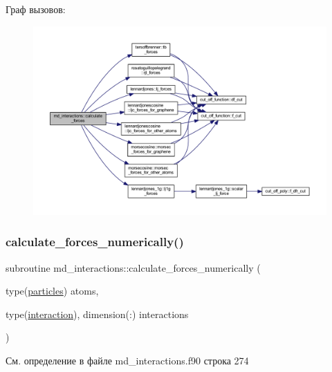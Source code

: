 Граф вызовов\+:\nopagebreak
\begin{figure}[H]
\begin{center}
\leavevmode
\includegraphics[width=350pt]{namespacemd__interactions_a851acddc07bbaa6d08cf33c60a9e6822_cgraph}
\end{center}
\end{figure}
\mbox{\label{namespacemd__interactions_a49c070421fed83b68f06a9b8b7f92048}} 
\subsubsection{\texorpdfstring{calculate\+\_\+forces\+\_\+numerically()}{calculate\_forces\_numerically()}}
{\footnotesize\ttfamily subroutine md\+\_\+interactions\+::calculate\+\_\+forces\+\_\+numerically (\begin{DoxyParamCaption}\item[{type(\mbox{\hyperlink{structmd__general_1_1particles}{particles}})}]{atoms,  }\item[{type(\mbox{\hyperlink{structmd__interactions_1_1interaction}{interaction}}), dimension(\+:)}]{interactions }\end{DoxyParamCaption})}



См. определение в файле md\+\_\+interactions.\+f90 строка 274



